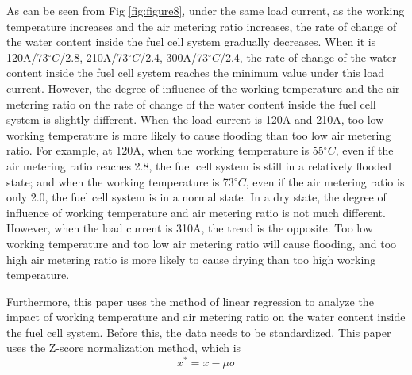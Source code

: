 As can be seen from Fig \ref{fig:figure8}, under the same load current, as the working temperature increases and the air metering ratio increases, the rate of change of the water content inside the fuel cell system gradually decreases. When it is 120A/73$^{\circ}C$/2.8, 210A/73$^{\circ}C$/2.4, 300A/73$^{\circ}C$/2.4, the rate of change of the water content inside the fuel cell system reaches the minimum value under this load current. However, the degree of influence of the working temperature and the air metering ratio on the rate of change of the water content inside the fuel cell system is slightly different. When the load current is 120A and 210A, too low working temperature is more likely to cause flooding than too low air metering ratio. For example, at 120A, when the working temperature is 55$^{\circ}C$, even if the air metering ratio reaches 2.8, the fuel cell system is still in a relatively flooded state; and when the working temperature is 73$^{\circ}C$, even if the air metering ratio is only 2.0, the fuel cell system is in a normal state. In a dry state, the degree of influence of working temperature and air metering ratio is not much different. However, when the load current is 310A, the trend is the opposite. Too low working temperature and too low air metering ratio will cause flooding, and too high air metering ratio is more likely to cause drying than too high working temperature.

\par
Furthermore, this paper uses the method of linear regression to analyze the impact of working temperature and air metering ratio on the water content inside the fuel cell system. Before this, the data needs to be standardized. This paper uses the Z-score normalization method, which is
$$x^{*}=x-\mu\sigma$$

